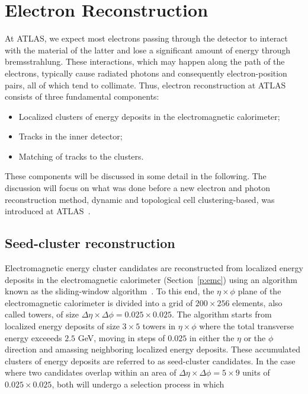 \section{Electron Reconstruction}\label{s:ereco}

At ATLAS, we expect most electrons passing through the detector to interact
with the material of the latter and lose a significant amount of energy through
bremsstrahlung. These interactions, which may happen along the path of the
electrons, typically cause radiated photons and consequently electron-position
pairs, all of which tend to collimate. Thus, electron reconstruction at ATLAS
consists of three fundamental components:

\begin{itemize}
	\item Localized clusters of energy deposits in the electromagnetic calorimeter;
	\item Tracks in the inner detector;
	\item Matching of tracks to the clusters.
\end{itemize}

These components will be discussed in some detail in the following. The
discussion will focus on what was done before a new electron and photon
reconstruction method, dynamic and topological cell clustering-based, was
introduced at ATLAS~\cite{atlaselscluster}.


\subsection{Seed-cluster reconstruction}

Electromagnetic energy cluster candidates are reconstructed from localized
energy deposits in the electromagnetic calorimeter (Section~\ref{p:emc}) using
an algorithm known as the sliding-window algorithm~\cite{calclusalg}. To this
end, the $\eta\times \phi$ plane of the electromagnetic calorimeter is divided
into a grid of $200\times 256$ elements, also called towers, of size $\Delta
	\eta \times \Delta \phi = 0.025 \times 0.025$. The algorithm starts from
localized energy deposits of size $3 \times 5$ towers in $\eta \times \phi$
where the total transverse energy exceeeds $2.5$ GeV, moving in steps of
$0.025$ in either the $\eta$ or the $\phi$ direction and amassing neighboring
localized energy deposits. These accumulated clusters of energy deposits are
referred to as seed-cluster candidates. In the case where two candidates
overlap within an area of $\Delta \eta\times \Delta \phi = 5 \times 9$ units of
$0.025 \times 0.025$, both will undergo a selection process in which

